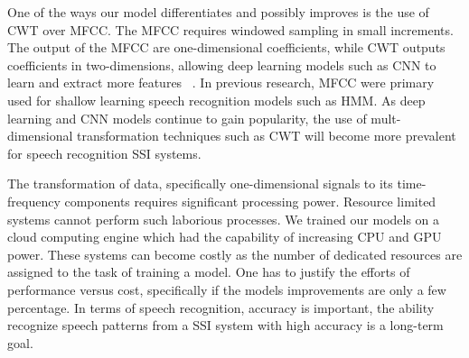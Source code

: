 \documentclass{article}
\begin{document}
One of the ways our model differentiates and possibly improves is the use of CWT over MFCC. The MFCC requires windowed sampling in small increments. The output of the MFCC are one-dimensional coefficients, while CWT outputs coefficients in two-dimensions, allowing deep learning models such as CNN to learn and extract more features ~\cite{huzaifah_comparison_2017}. In previous research, MFCC were primary used for shallow learning speech recognition models such as HMM. As deep learning and CNN models continue to gain popularity, the use of mult-dimensional transformation techniques such as CWT will become more prevalent for speech recognition SSI systems. 

The transformation of data, specifically one-dimensional signals to its time-frequency components requires significant processing power. Resource limited systems cannot perform such laborious processes. We trained our models on a cloud computing engine which had the capability of increasing CPU and GPU power. These systems can become costly as the number of dedicated resources are assigned to the task of training a model. One has to justify the efforts of performance versus cost, specifically if the models improvements are only a few percentage. In terms of speech recognition, accuracy is important, the ability recognize speech patterns from a SSI system with high accuracy is a long-term goal.  


%
\end{document}
